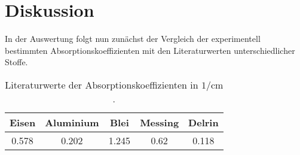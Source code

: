 \newpage
\section{Diskussion}

In der Auswertung folgt nun zunächst der Vergleich der experimentell bestimmten Absorptionskoeffizienten mit den Literaturwerten unterschiedlicher Stoffe.

\begin{table}
    \centering
    \begin{tabular}{c c c c c}
    \toprule
    Eisen & Aluminium & Blei & Messing & Delrin\\
     \midrule 
    0.578 & 0.202 & 1.245 & 0.62 & 0.118\\
\bottomrule
\end{tabular}
\caption{Literaturwerte der Absorptionskoeffizienten in $\si{1\per\centi\metre}$ \cite{chemie} \cite{delrin}.}
\label{tab:lit}
\end{table}

